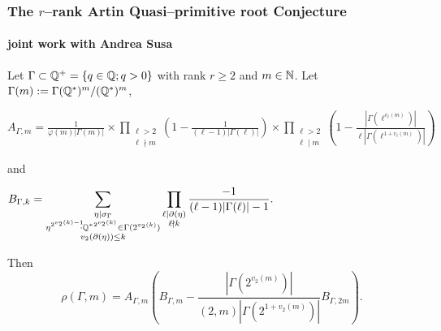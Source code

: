 \documentclass[10pt,handout]{beamer} %
\begin{document}
 \begin{frame}
 \frametitle{The $r$--rank Artin Quasi--primitive root Conjecture}
\framesubtitle{joint work with Andrea Susa}

\begin{Theorem}
 Let $\Gamma \subset \mathbb Q^+=\{q\in\mathbb Q; q>0\}$  with rank $r\ge2$ and $m\in\mathbb N$. Let $\Gamma(m):=\Gamma(\mathbb Q^*)^m/(\mathbb Q^*)^m$,\medskip

{\scriptsize{
 \centerline{$\displaystyle{A_{\Gamma,m}=\frac1{\varphi(m)|\Gamma(m)|}\times
\prod_{\substack{\ell>2\\ \ell\nmid
m}}\left(1-\frac1{(\ell-1)|\Gamma(\ell)|}\right)
\times\prod_{\substack{\ell>2\\ \ell\mid
m}}\left(1-\frac{|\Gamma(\ell^{v_\ell(m)})|}{\ell|\Gamma(\ell^{1+v_\ell(m)})|}\right)
}$}}}\medskip

and \medskip

{\scriptsize{
 \centerline{$\displaystyle{ B_{\Gamma,k} =\sum_{\substack{
\eta\mid\sigma_\Gamma\\
 \eta^{2^{v_2(k)-1}}\!\!\!\cdot{\mathbb Q^*}^{2^{v_2(k)}}\in\Gamma(2^{v_2(k)})\\ 
v_2(\partial(\eta))\le k}}\prod_{\substack{\ell\mid \partial(\eta)\\
\ell\nmid k}}\frac{-1}{(\ell-1)|\Gamma(\ell)|-1}.
}$}}}

Then
$$\rho(\Gamma,m) = A_{\Gamma,m}\left(  B_{\Gamma,m}
-\frac{|\Gamma(2^{v_{2}(m)})|}{(2,m)|\Gamma(2^{1+v_{2}(m)})|} B_{\Gamma,2m}\right).$$
\end{Theorem}
\end{frame}
 
\end{document}
